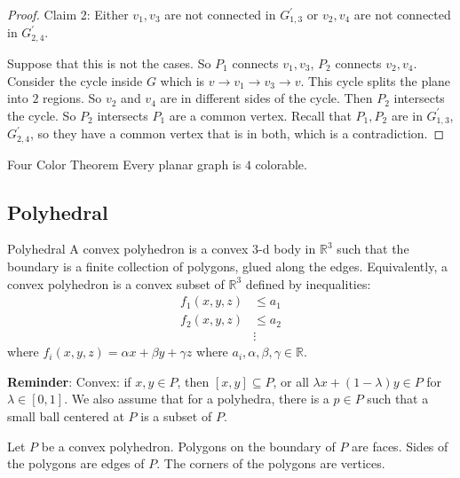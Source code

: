 \documentclass{report}
\begin{document}
\begin{proof}
        Claim 2: Either $v_{1}, v_{3}$ are not connected in $G^{\prime}_{1, 3}$ or $v_{2}, v_{4}$ are not connected in $G^{\prime}_{2, 4}$.

        Suppose that this is not the cases. So $P_{1}$ connects $v_{1}, v_{3}$, $P_{2}$ connects $v_{2}, v_{4}$. Consider the cycle inside $G$ which is $v \rightarrow  v_{ 1} \rightarrow v_{ 3} \rightarrow v$. This cycle splits the plane into $2$ regions. So $v_{2}$ and $v_{4}$ are in different sides of the cycle. Then $P_{2}$ intersects the cycle. So $P_{2}$ intersects $P_{1}$ are a common vertex. Recall that $P_{1}, P_{2}$ are in $G^{\prime}_{1, 3}$, $G^{\prime}_{2, 4}$, so they have a common vertex that is in both, which is a contradiction. 
    \end{proof}

\begin{theorem}{Four Color Theorem}
    Every planar graph is $4$ colorable. 
\end{theorem}

\begin{topic}
    \section{Polyhedral}
\end{topic}

\begin{definition}{Polyhedral}
    A convex polyhedron is a convex $3$-d body in $\mathbb{R}^{3}$ such that the boundary is a finite collection of polygons, glued along the edges. Equivalently, a convex polyhedron is a convex subset of $\mathbb{R}^{3}$ defined by inequalities:
        \begin{align*}
            f_{1}(x, y,z)  & \leq   a_{1} \\
            f_{2}(x, y, z) &\leq    a_{2} \\
                           &\vdots          
        \end{align*}
    where $f_{i}(x, y, z) = \alpha x + \beta  y +  \gamma  z$ where $a_{i}, \alpha, \beta, \gamma \in  \mathbb{ R}$.
\end{definition} 

\textbf{Reminder}: Convex: if $x, y \in P$, then $[x, y] \subseteq P$, or all $\lambda x + ( 1 - \lambda) y \in P$ for $\lambda \in  [ 0, 1]$. We also assume that for a polyhedra, there is a $p \in P$ such that a small ball centered at $P$ is a subset of $P$.

Let $P$ be a convex polyhedron. Polygons on the boundary of $P$ are faces. Sides of the polygons are edges of $P$. The corners of the polygons are vertices.
\end{document}

